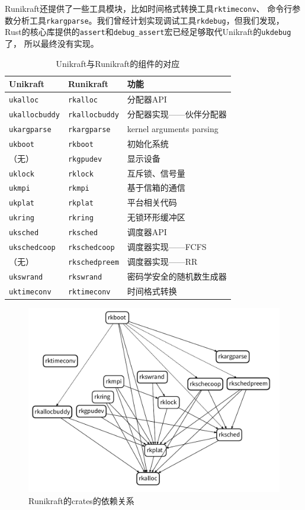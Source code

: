 \documentclass{../runikraft-report}
\begin{document}
Runikraft还提供了一些工具模块，比如时间格式转换工具\texttt{rktimeconv}、
命令行参数分析工具\texttt{rkargparse}。我们曾经计划实现调试工具\texttt{rkdebug}，但我们发现，
Rust的核心库提供的\texttt{assert}和\texttt{debug\_assert}宏已经足够取代Unikraft的\texttt{ukdebug}了，
所以最终没有实现。

\begin{table}[!hbt]
\caption{Unikraft与Runikraft的组件的对应}
\centering
\begin{tabular}{lll}
\hline
Unikraft&Runikraft&功能\\\hline
\texttt{ukalloc}&\texttt{rkalloc}&分配器API\\
\texttt{ukallocbuddy}&\texttt{rkallocbuddy}&分配器实现——伙伴分配器\\
\texttt{ukargparse}&\texttt{rkargparse}&kernel arguments parsing\\
\texttt{ukboot}&\texttt{rkboot}&初始化系统\\
（无）&\texttt{rkgpudev}&显示设备\\
\texttt{uklock}&\texttt{rklock}&互斥锁、信号量\\
\texttt{ukmpi}&\texttt{rkmpi}&基于信箱的通信\\
\texttt{ukplat}&\texttt{rkplat}&平台相关代码\\
\texttt{ukring}&\texttt{rkring}&无锁环形缓冲区\\
\texttt{uksched}&\texttt{rksched}&调度器API\\
\texttt{ukschedcoop}&\texttt{rkschedcoop}&调度器实现——FCFS\\
（无）&\texttt{rkschedpreem}&调度器实现——RR\\
\texttt{ukswrand}&\texttt{rkswrand}&密码学安全的随机数生成器\\
\texttt{uktimeconv}&\texttt{rktimeconv}&时间格式转换\\
\hline
\end{tabular}
\end{table}

\begin{figure}[!htb]
\centering
\includegraphics[width=\linewidth]{../assets/crates-dependency.pdf}
\caption{Runikraft的crates的依赖关系}
\end{figure}
\end{document}
